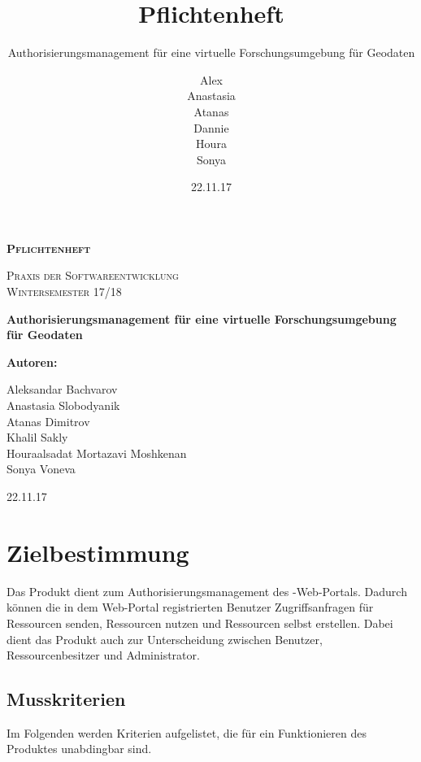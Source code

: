 \documentclass[parskip=full,11pt]{scrartcl}
\title{Pflichtenheft}
\subtitle{Authorisierungsmanagement für eine virtuelle Forschungsumgebung für Geodaten}
\author{Alex\\Anastasia\\Atanas\\Dannie\\ Houra\\Sonya\\}
\date{22.11.17}
\begin{document}
\begin{titlepage}
	
	\begin{center}
	{\scshape\LARGE\bfseries Pflichtenheft \par}
	\vspace{1cm}
	{\scshape\Large Praxis der Softwareentwicklung\\}
	\vspace{1cm}
	{\scshape\Large Wintersemester 17/18\\}
	\vspace{3cm}
	{\huge\bfseries Authorisierungsmanagement für eine virtuelle Forschungsumgebung für Geodaten\par}
	\vspace{2cm}
	\vfill
	{\bfseries {\Large Autoren}:\par}
	{\Large Aleksandar Bachvarov}\\
	{\Large Anastasia Slobodyanik}\\
	{\Large Atanas Dimitrov}\\
	{\Large Khalil Sakly}\\
	{\Large Houraalsadat Mortazavi Moshkenan}\\
	{\Large Sonya Voneva}\\
	\vfill
	{\large 22.11.17 \par}
	\end{center}
\end{titlepage}
\tableofcontents

\newpage
\section{Zielbestimmung}
Das Produkt dient zum Authorisierungsmanagement des \grqq -Web-Portals. Dadurch können die in dem \gls{Web-Portal} registrierten \gls{Benutzer} Zugriffsanfragen für Ressourcen senden, Ressourcen nutzen und Ressourcen selbst erstellen. Dabei dient das Produkt auch zur Unterscheidung zwischen Benutzer, \gls{Ressourcenbesitzer} und \gls{Administrator}.

\subsection{Musskriterien}
Im Folgenden werden Kriterien aufgelistet, die für ein Funktionieren des Produktes unabdingbar sind.
\end{document}
